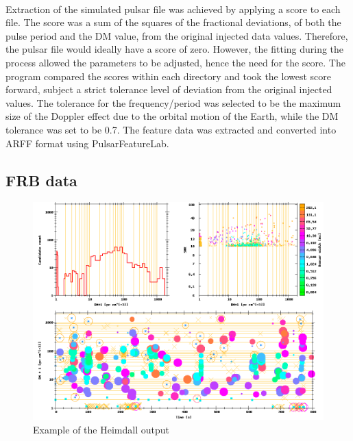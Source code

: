 \documentclass[12pt]{article}
\begin{document}
\paragraph{}
Extraction of the simulated pulsar file was achieved by applying a score to each file. The score was a sum of the squares of the fractional deviations, of  both the pulse period and the DM value, from the original injected data values. Therefore, the pulsar file would ideally have a score of zero. However, the fitting during the process allowed the parameters to be adjusted, hence the need for the score. The program compared the scores within each directory and took the lowest score forward, subject a strict tolerance level of deviation from the original injected values. The tolerance for the frequency/period was selected to be the maximum size of the Doppler effect due to the orbital motion of the Earth, while the DM tolerance was set to be 0.7. The feature data was extracted and converted into ARFF format using PulsarFeatureLab.

\subsection{FRB data}

\begin{figure}[h!]
\begin{center}
\includegraphics[scale=0.4]{HR_0222-44_injected.png}
\caption{Example of the Heimdall output}
\label{FRBheimdall}
\end{center}
\end{figure}
\end{document}
